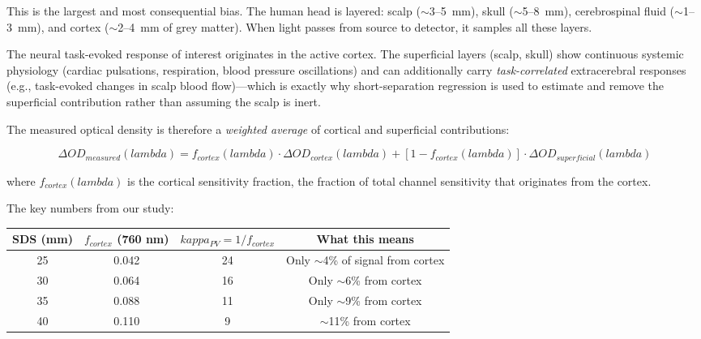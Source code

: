 \documentclass[12pt]{article}
\def\kappa{kappa}%
\def\lambda{lambda}%
\def\text#1{#1}%
\def\,{ }%
\begin{document}
This is the largest and most consequential bias. The human head is layered: scalp ($\sim$3--5~mm), skull ($\sim$5--8~mm), cerebrospinal fluid ($\sim$1--3~mm), and cortex ($\sim$2--4~mm of grey matter). When light passes from source to detector, it samples all these layers.

The neural task-evoked response of interest originates in the active cortex. The superficial layers (scalp, skull) show continuous systemic physiology (cardiac pulsations, respiration, blood pressure oscillations) and can additionally carry \emph{task-correlated} extracerebral responses (e.g., task-evoked changes in scalp blood flow)---which is exactly why short-separation regression is used to estimate and remove the superficial contribution rather than assuming the scalp is inert.

The measured optical density is therefore a \emph{weighted average} of cortical and superficial contributions:

\begin{equation}
\Delta\text{OD}_{\text{measured}}(\lambda) = f_{\text{cortex}}(\lambda) \cdot \Delta\text{OD}_{\text{cortex}}(\lambda) + [1 - f_{\text{cortex}}(\lambda)] \cdot \Delta\text{OD}_{\text{superficial}}(\lambda)
\end{equation}

where $f_{\text{cortex}}(\lambda)$ is the cortical sensitivity fraction, the fraction of total channel sensitivity that originates from the cortex.

The key numbers from our study:

\begin{center}
\begin{tabular}{cccc}
\hline
\textbf{SDS (mm)} & $f_{\text{cortex}}$ (760\,nm) & $\kappa_{\text{PV}}=1/f_{\text{cortex}}$ & \textbf{What this means} \\
\hline
25 & 0.042 & 24 & Only $\sim$4\% of signal from cortex \\
30 & 0.064 & 16 & Only $\sim$6\% from cortex \\
35 & 0.088 & 11 & Only $\sim$9\% from cortex \\
40 & 0.110 & 9 & $\sim$11\% from cortex \\
\hline
\end{tabular}
\end{center}
\end{document}
